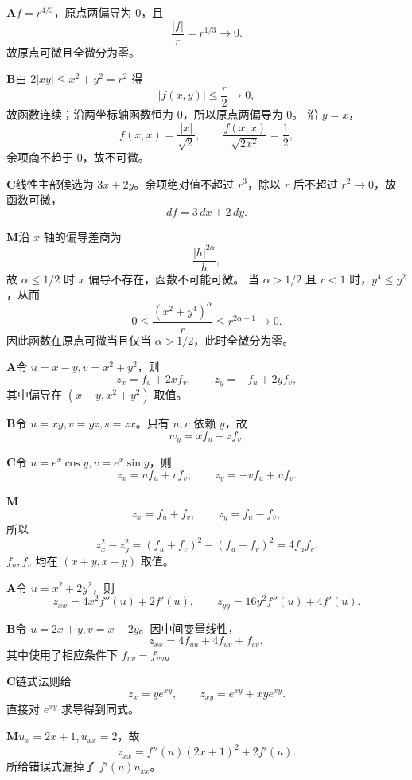 \begin{solutionBox}
\textbf{A}\quad \(f=r^{4/3}\)，原点两偏导为 \(0\)，且
\[
\frac{|f|}{r}=r^{1/3}\to0.
\]
故原点可微且全微分为零。

\textbf{B}\quad 由 \(2|xy|\le x^2+y^2=r^2\) 得
\[
|f(x,y)|\le\frac r2\to0,
\]
故函数连续；沿两坐标轴函数恒为 \(0\)，所以原点两偏导为 \(0\)。
沿 \(y=x\)，
\[
f(x,x)=\frac{|x|}{\sqrt2},\qquad
\frac{f(x,x)}{\sqrt{2x^2}}=\frac12,
\]
余项商不趋于 \(0\)，故不可微。

\textbf{C}\quad 线性主部候选为 \(3x+2y\)。余项绝对值不超过
\(r^3\)，除以 \(r\) 后不超过 \(r^2\to0\)，故函数可微，
\[
df=3\,dx+2\,dy.
\]

\textbf{M}\quad 沿 \(x\) 轴的偏导差商为
\[
\frac{|h|^{2\alpha}}h,
\]
故 \(\alpha\le1/2\) 时 \(x\) 偏导不存在，函数不可能可微。
当 \(\alpha>1/2\) 且 \(r<1\) 时，\(y^4\le y^2\)，从而
\[
0\le\frac{(x^2+y^4)^\alpha}{r}
\le r^{2\alpha-1}\to0.
\]
因此函数在原点可微当且仅当 \(\alpha>1/2\)，此时全微分为零。
\end{solutionBox}

\begin{solutionBox}
\textbf{A}\quad 令 \(u=x-y,v=x^2+y^2\)，则
\[
z_x=f_u+2xf_v,\qquad z_y=-f_u+2yf_v,
\]
其中偏导在 \((x-y,x^2+y^2)\) 取值。

\textbf{B}\quad 令 \(u=xy,v=yz,s=zx\)。只有 \(u,v\) 依赖 \(y\)，故
\[
w_y=xf_u+zf_v.
\]

\textbf{C}\quad 令 \(u=e^x\cos y,v=e^x\sin y\)，则
\[
z_x=uf_u+vf_v,\qquad z_y=-vf_u+uf_v.
\]

\textbf{M}\quad
\[
z_x=f_u+f_v,\qquad z_y=f_u-f_v,
\]
所以
\[
z_x^2-z_y^2=(f_u+f_v)^2-(f_u-f_v)^2=4f_uf_v.
\]
\(f_u,f_v\) 均在 \((x+y,x-y)\) 取值。
\end{solutionBox}

\begin{solutionBox}
\textbf{A}\quad 令 \(u=x^2+2y^2\)，则
\[
z_{xx}=4x^2f''(u)+2f'(u),\qquad
z_{yy}=16y^2f''(u)+4f'(u).
\]

\textbf{B}\quad 令 \(u=2x+y,v=x-2y\)。因中间变量线性，
\[
z_{xx}=4f_{uu}+4f_{uv}+f_{vv},
\]
其中使用了相应条件下 \(f_{uv}=f_{vu}\)。

\textbf{C}\quad 链式法则给
\[
z_x=ye^{xy},\qquad z_{xy}=e^{xy}+xye^{xy}.
\]
直接对 \(e^{xy}\) 求导得到同式。

\textbf{M}\quad \(u_x=2x+1,u_{xx}=2\)，故
\[
z_{xx}=f''(u)(2x+1)^2+2f'(u).
\]
所给错误式漏掉了 \(f'(u)u_{xx}\)。
\end{solutionBox}

